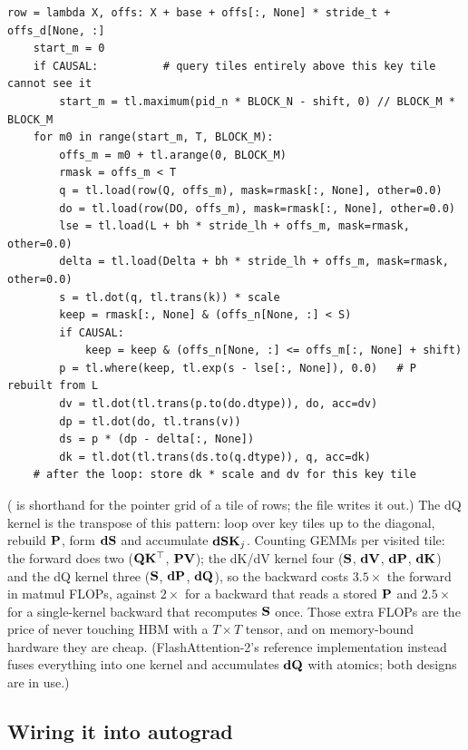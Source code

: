 \begin{lstlisting}[caption={The dK/dV kernel's loop over query tiles (reflowed).},label={lst:perf:dkdv}]
    row = lambda X, offs: X + base + offs[:, None] * stride_t + offs_d[None, :]
    start_m = 0
    if CAUSAL:          # query tiles entirely above this key tile cannot see it
        start_m = tl.maximum(pid_n * BLOCK_N - shift, 0) // BLOCK_M * BLOCK_M
    for m0 in range(start_m, T, BLOCK_M):
        offs_m = m0 + tl.arange(0, BLOCK_M)
        rmask = offs_m < T
        q = tl.load(row(Q, offs_m), mask=rmask[:, None], other=0.0)
        do = tl.load(row(DO, offs_m), mask=rmask[:, None], other=0.0)
        lse = tl.load(L + bh * stride_lh + offs_m, mask=rmask, other=0.0)
        delta = tl.load(Delta + bh * stride_lh + offs_m, mask=rmask, other=0.0)
        s = tl.dot(q, tl.trans(k)) * scale
        keep = rmask[:, None] & (offs_n[None, :] < S)
        if CAUSAL:
            keep = keep & (offs_n[None, :] <= offs_m[:, None] + shift)
        p = tl.where(keep, tl.exp(s - lse[:, None]), 0.0)   # P rebuilt from L
        dv = tl.dot(tl.trans(p.to(do.dtype)), do, acc=dv)
        dp = tl.dot(do, tl.trans(v))
        ds = p * (dp - delta[:, None])
        dk = tl.dot(tl.trans(ds.to(q.dtype)), q, acc=dk)
    # after the loop: store dk * scale and dv for this key tile
\end{lstlisting}

( is shorthand for the pointer grid of a tile of rows; the file writes it out.)
The dQ kernel is the transpose of this pattern: loop over key tiles up to the diagonal, rebuild
$\mathbf{P}$, form $\mathbf{dS}$ and accumulate $\mathbf{dS}\mathbf{K}_j$. Counting GEMMs per visited tile:
the forward does two ($\mathbf{Q}\mathbf{K}^\top$, $\mathbf{P}\mathbf{V}$); the dK/dV kernel four ($\mathbf{S}$,
$\mathbf{dV}$, $\mathbf{dP}$, $\mathbf{dK}$) and the dQ kernel three ($\mathbf{S}$, $\mathbf{dP}$, $\mathbf{dQ}$), so the
backward costs $3.5\times$ the forward in matmul FLOPs, against $2\times$ for a backward that reads a
stored $\mathbf{P}$ and $2.5\times$ for a single-kernel backward that recomputes $\mathbf{S}$ once. Those extra FLOPs are the price of never touching HBM with a $T\times T$ tensor, and on
memory-bound hardware they are cheap. (FlashAttention-2's reference implementation instead
fuses everything into one kernel and accumulates $\mathbf{dQ}$ with atomics; both designs are in use.)

\subsection{Wiring it into autograd}

